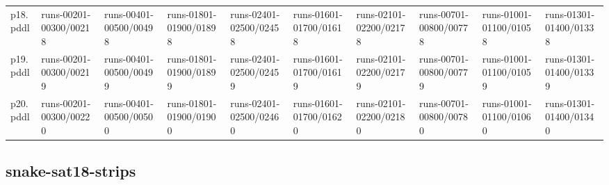 \documentclass{article}
\begin{document}
\begin{tabular}{@{}lrrrrrrrrr@{}}
p18.pddl & \multicolumn{1}{|l|}{runs-00201-00300/00218} & \multicolumn{1}{|l|}{runs-00401-00500/00498} & \multicolumn{1}{|l|}{runs-01801-01900/01898} & \multicolumn{1}{|l|}{runs-02401-02500/02458} & \multicolumn{1}{|l|}{runs-01601-01700/01618} & \multicolumn{1}{|l|}{runs-02101-02200/02178} & \multicolumn{1}{|l|}{runs-00701-00800/00778} & \multicolumn{1}{|l|}{runs-01001-01100/01058} & \multicolumn{1}{|l|}{runs-01301-01400/01338} \\
p19.pddl & \multicolumn{1}{|l|}{runs-00201-00300/00219} & \multicolumn{1}{|l|}{runs-00401-00500/00499} & \multicolumn{1}{|l|}{runs-01801-01900/01899} & \multicolumn{1}{|l|}{runs-02401-02500/02459} & \multicolumn{1}{|l|}{runs-01601-01700/01619} & \multicolumn{1}{|l|}{runs-02101-02200/02179} & \multicolumn{1}{|l|}{runs-00701-00800/00779} & \multicolumn{1}{|l|}{runs-01001-01100/01059} & \multicolumn{1}{|l|}{runs-01301-01400/01339} \\
p20.pddl & \multicolumn{1}{|l|}{runs-00201-00300/00220} & \multicolumn{1}{|l|}{runs-00401-00500/00500} & \multicolumn{1}{|l|}{runs-01801-01900/01900} & \multicolumn{1}{|l|}{runs-02401-02500/02460} & \multicolumn{1}{|l|}{runs-01601-01700/01620} & \multicolumn{1}{|l|}{runs-02101-02200/02180} & \multicolumn{1}{|l|}{runs-00701-00800/00780} & \multicolumn{1}{|l|}{runs-01001-01100/01060} & \multicolumn{1}{|l|}{runs-01301-01400/01340} \\
\end{tabular}

\hypertarget{run_dir-snake-sat18-strips}{}
\subsection*{snake-sat18-strips}
\end{document}

